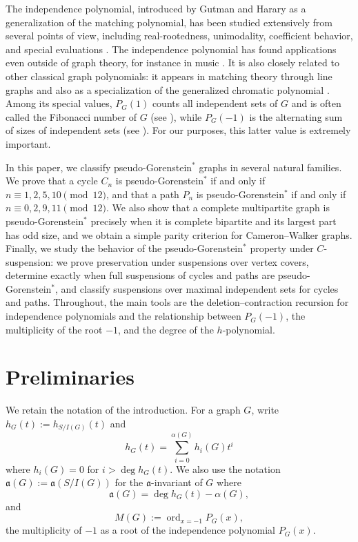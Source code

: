 \documentclass[12pt]{amsart}
\theoremstyle{plain}
\theoremstyle{definition}
\DeclareMathOperator{\ord}{ord}
\begin{document}
The independence polynomial, introduced by Gutman and Harary as a generalization of the matching polynomial, has been studied extensively from several points of view, including real-rootedness, unimodality, coefficient behavior, and special evaluations \cite{GutmanHarary,Claw_free_ind_poly,Unimodal_ind_poly}. The independence polynomial has found applications even outside of graph theory, for instance in music \cite{Application_music_ind_poly}. It is also closely related to other classical graph polynomials: it appears in matching theory through line graphs and also as a specialization of the generalized chromatic polynomial \cite{Gen_choromatic_poly}. Among its special values, \(P_G(1)\) counts all independent sets of \(G\) and is often called the Fibonacci number of \(G\) (see \cite{Fibonaci_main,Fibonacci,Unicyclic}), while \(P_G(-1)\) is the alternating sum of sizes of independent sets (see \cite{levit2009independence_preprint,Levit_Mandrescu,Ind_complex}). For our purposes, this latter value is extremely important.



In this paper, we classify pseudo-Gorenstein\(^{*}\) graphs in several natural families. We prove that a cycle \(C_n\) is pseudo-Gorenstein\(^{*}\) if and only if \(n\equiv 1,2,5,10 \pmod{12}\), 
and that a path \(P_n\) is pseudo-Gorenstein\(^{*}\) if and only if \(n\equiv 0,2,9,11 \pmod{12}\). 
We also show that a complete multipartite graph is pseudo-Gorenstein\(^{*}\) precisely when it is complete bipartite and its largest part has odd size, and we obtain a simple parity criterion for Cameron--Walker graphs. Finally, we study the behavior of the pseudo-Gorenstein\(^{*}\) property under \(C\)-suspension: we prove preservation under suspensions over  vertex covers, determine exactly when full suspensions of cycles and paths are pseudo-Gorenstein\(^{*}\), and classify suspensions over maximal independent sets for cycles and paths. Throughout, the main tools are the deletion--contraction recursion for independence polynomials and the relationship between \(P_G(-1)\), the multiplicity of the root \(-1\), and the degree of the \(h\)-polynomial.


\section{Preliminaries}

We retain the notation of the introduction. For a graph \(G\), write $h_G(t):=h_{S/I(G)}(t)$ and
\[
h_G(t)=\sum_{i=0}^{\alpha(G)} h_i(G)t^i
\]
where \(h_i(G)=0\) for \(i>\deg h_G(t)\). We also use the notation $\mathfrak a(G) := \mathfrak a(S/I(G))$ for the $\mathfrak a$-invariant of $G$ where
\[
\mathfrak a(G)=\deg h_G(t)-\alpha(G),
\]
and
\[
M(G):=\ord_{x=-1}P_G(x),
\]
the multiplicity of \(-1\) as a root of the independence polynomial \(P_G(x)\).
\end{document}
